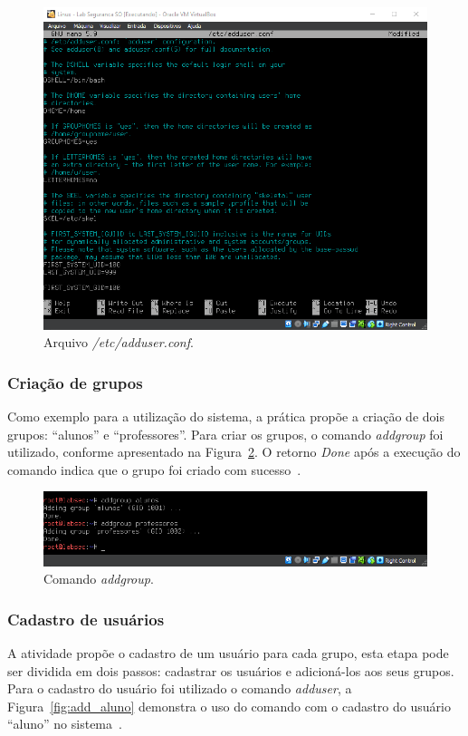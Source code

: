 \documentclass[
    12pt,				%
    oneside,   	        %
    a4paper,			%
    english,			%
    french,				%
    spanish,			%
    brazil,				%
    ]{pacotes/abntex2}
\begin{document}
\begin{figure}[H]
  \centering
  \includegraphics[scale=0.7]{figuras/nano_adduser.png}
  \caption{Arquivo \textit{/etc/adduser.conf}.}
  \label{fig:adduser}
\end{figure}

\subsubsection{Criação de grupos}
Como exemplo para a utilização do sistema, a prática propõe a criação de dois grupos: ``alunos'' e ``professores''. Para criar os grupos, o comando \textit{addgroup} foi utilizado, conforme apresentado na Figura~\ref{fig:addgroup}. O retorno \textit{Done} após a execução do comando indica que o grupo foi criado com sucesso~\cite{guiafocaSegurança}.

\begin{figure}[H]
  \centering
  \includegraphics[scale=0.7]{figuras/addgroups.png}
  \caption{Comando \textit{addgroup}.}
  \label{fig:addgroup}
\end{figure}

\subsubsection{Cadastro de usuários}
A atividade propõe o cadastro de um usuário para cada grupo, esta etapa pode ser dividida em dois passos: cadastrar os usuários e adicioná-los aos seus grupos. Para o cadastro do usuário foi utilizado o comando \textit{adduser}, a Figura~\ref{fig:add_aluno} demonstra o uso do comando com o cadastro do usuário ``aluno'' no sistema~\cite{guiafocaSegurança}.
\end{document}
